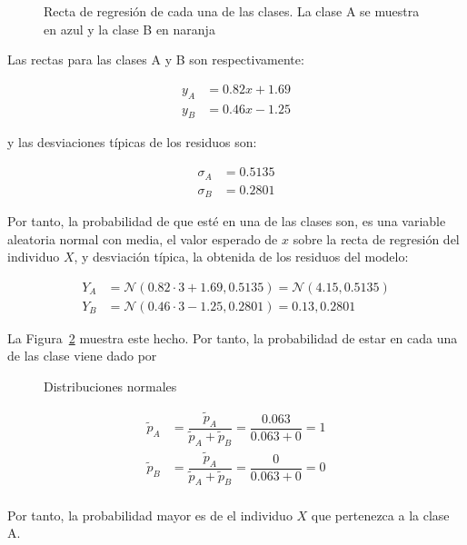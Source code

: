 \begin{ejemplo}
	\begin{figure}[htbp!]
		\centering
		\regresionred
		\caption[Recta de regresión de cada una de las clases]{Recta de regresión de cada una de las clases. La clase A se muestra en azul y la clase B en naranja}
		\label{fig:reg_rectas}
	\end{figure}
	
	Las rectas para las clases A y B son respectivamente:
	
	\begin{align*}
	y_A & = 0.82x + 1.69 \\
	y_B & = 0.46x - 1.25
	\end{align*}
	
	y las desviaciones típicas de los residuos son:
	
	\begin{align*}
	\sigma_A & = 0.5135\\
	\sigma_B & = 0.2801
	\end{align*}
	
	Por tanto, la probabilidad de que esté en una de las clases son, es una variable aleatoria normal con media, el valor esperado de $x$ sobre la recta de regresión del individuo $X$, y desviación típica, la obtenida de los residuos del modelo:
	
	\begin{align*}
	Y_A & = \mathcal{N}(0.82\cdot 3 + 1.69, 0.5135) = \mathcal{N}(4.15, 0.5135)\\
	Y_B & = \mathcal{N}(0.46\cdot 3 - 1.25, 0.2801) = \mathcal{0.13, 0.2801}
	\end{align*}
	
	La Figura~\ref{fig:dist_normales} muestra este hecho. Por tanto, la probabilidad de estar en cada una de las clase viene dado por 
	
	\begin{figure}[htbp!]
		\centering
		\distnormales
		\caption{Distribuciones normales}
		\label{fig:dist_normales}
	\end{figure}
	
	\begin{align*}
	\tilde{p}_A & = \dfrac{\tilde{p}_A}{\tilde{p}_A + \tilde{p}_B} = \dfrac{0.063}{0.063 + 0} = 1 \\
	\tilde{p}_B & = \dfrac{\tilde{p}_A}{\tilde{p}_A + \tilde{p}_B} = \dfrac{0}{0.063 + 0} = 0 \\
	\end{align*}
	
	Por tanto, la probabilidad mayor es de el individuo $X$ que pertenezca a la clase A.\\
	

\end{ejemplo}
